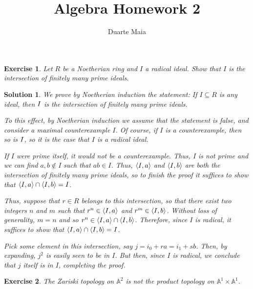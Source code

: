 \documentclass{article}
\title{Algebra Homework 2}
\author{Duarte Maia}
\newtheorem{ex}{Exercise}
\theoremstyle{nonumberplain}
\newtheorem{sol}{Solution}
\let\radical\relax
\DeclareMathOperator{\radical}{rad}
\newcommand{\Aff}{\mathbb{A}}
\DeclarePairedDelimiter{\braket}{\langle}{\rangle}
\begin{document}
\maketitle

\begin{ex}
Let $R$ be a Noetherian ring and $I$ a radical ideal. Show that $I$ is the intersection of finitely many prime ideals.
\end{ex}

\begin{sol}
We prove by Noetherian induction the statement: If $I \subseteq R$ is \emph{any} ideal, then $\radical I$ is the intersection of finitely many prime ideals.

To this effect, by Noetherian induction we assume that the statement is false, and consider a maximal counterexample $I$. Of course, if $I$ is a counterexample, then so is $\radical I$, so it is the case that $I$ is a radical ideal.

If $I$ were prime itself, it would not be a counterexample. Thus, $I$ is not prime and we can find $a, b \not \in I$ such that $ab \in I$. Thus, $\radical \braket{I,a}$ and $\radical \braket{I,b}$ are both the intersection of finitely many prime ideals, so to finish the proof it suffices to show that $\radical \braket{I,a} \cap \radical \braket{I,b} = I$.

Thus, suppose that $r \in R$ belongs to this intersection, so that there exist two integers $n$ and $m$ such that $r^n \in \braket{I,a}$ and $r^m \in \braket{I,b}$. Without loss of generality, $m = n$ and so $r^n \in \braket{I,a} \cap \braket{I,b}$. Therefore, since $I$ is radical, it suffices to show that $\braket{I,a} \cap \braket{I,b} = I$.

Pick some element in this intersection, say $j = i_0 + r a = i_1 + s b$. Then, by expanding, $j^2$ is easily seen to be in $I$. But then, since $I$ is radical, we conclude that $j$ itself is in $I$, completing the proof.
\end{sol}

\begin{ex}
The Zariski topology on $\Aff^2$ is not the product topology on $\Aff^1 \times \Aff^1$.
\end{ex}
\end{document}
